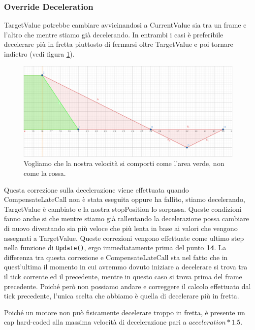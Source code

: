 \documentclass[main.tex]{subfiles}
\begin{document}
\subsubsection{Override Deceleration}\label{subsubsec:4_2_OverrideDeceleration}
TargetValue potrebbe cambiare avvicinandosi a CurrentValue sia tra un frame e l'altro che mentre stiamo già decelerando. In entrambi i casi è preferibile decelerare più in fretta piuttosto di fermarsi oltre TargetValue e poi tornare indietro (vedi figura \ref{fig:4_OverrideDecelIntro}).
\begin{figure}[H]
    \centering
    \includegraphics[width=.95\linewidth]{img/interpolazione/OverrideDecelIntro.png}
    \caption{Vogliamo che la nostra velocità si comporti come l'area verde, non come la rossa.}
    \label{fig:4_OverrideDecelIntro}
\end{figure}
\noindent Questa correzione sulla decelerazione viene effettuata quando CompensateLateCall non è stata eseguita oppure ha fallito, stiamo decelerando, TargetValue è cambiato e la nostra stopPosition lo sorpassa. Queste condizioni fanno anche si che mentre stiamo già rallentando la decelerazione possa cambiare di nuovo diventando sia più veloce che più lenta in base ai valori che vengono assegnati a TargetValue. Queste correzioni vengono effettuate come ultimo step nella funzione di \lstinline{Update()}, ergo immediatamente prima del punto \textbf{14}. \newline
La differenza tra questa correzione e CompensateLateCall sta nel fatto che in quest'ultima il momento in cui avremmo dovuto iniziare a decelerare si trova tra il tick corrente ed il precedente, mentre in questo caso si trova prima del frame precedente. Poiché però non possiamo andare  e correggere il calcolo effettuato dal tick precedente, l'unica scelta che abbiamo è quella di decelerare più in fretta.\newline

Poiché un motore non può fisicamente decelerare troppo in fretta, è presente un cap hard-coded alla massima velocità di decelerazione pari a $acceleration * 1.5$.
\end{document}
